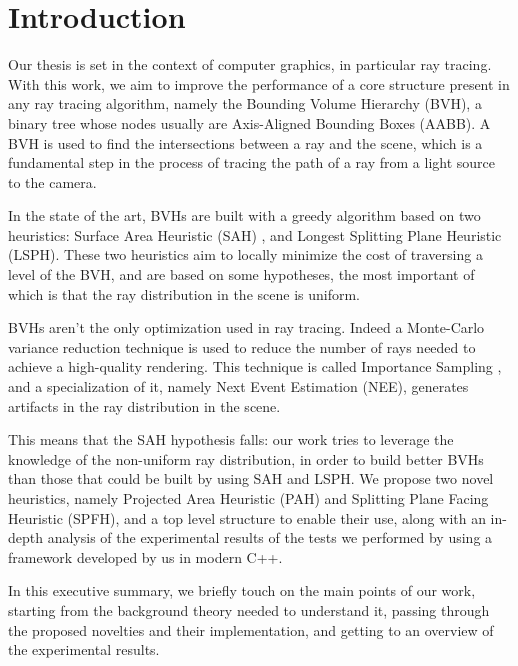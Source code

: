 \documentclass[11pt,a4paper,twocolumn]{article}
\begin{document}


\pagebreak
\fontsize{10.1pt}{0.45cm}\selectfont
\section{Introduction}
Our thesis is set in the context of computer graphics, in particular ray tracing. With this work, we aim to improve the performance of a core structure present in any ray tracing algorithm, namely the Bounding Volume Hierarchy (BVH), a binary tree whose nodes usually are Axis-Aligned Bounding Boxes (AABB). A BVH is used to find the intersections between a ray and the scene, which is a fundamental step in the process of tracing the path of a ray from a light source to the camera.

In the state of the art, BVHs are built with a greedy algorithm based on two heuristics: Surface Area Heuristic (SAH) \cite{sah}, and Longest Splitting Plane Heuristic (LSPH). These two heuristics aim to locally minimize the cost of traversing a level of the BVH, and are based on some hypotheses, the most important of which is that the ray distribution in the scene is uniform.

BVHs aren't the only optimization used in ray tracing. Indeed a Monte-Carlo variance reduction technique is used to reduce the number of rays needed to achieve a high-quality rendering. This technique is called Importance Sampling \cite{importance_sampling}, and a specialization of it, namely Next Event Estimation (NEE), generates artifacts in the ray distribution in the scene.

This means that the SAH hypothesis falls: our work tries to leverage the knowledge of the non-uniform ray distribution, in order to build better BVHs than those that could be built by using SAH and LSPH. We propose two novel heuristics, namely Projected Area Heuristic (PAH) and Splitting Plane Facing Heuristic (SPFH), and a top level structure to enable their use, along with an in-depth analysis of the experimental results of the tests we performed by using a framework developed by us in modern C++.

In this executive summary, we briefly touch on the main points of our work, starting from the background theory needed to understand it, passing through the proposed novelties and their implementation, and getting to an overview of the experimental results.
\end{document}
